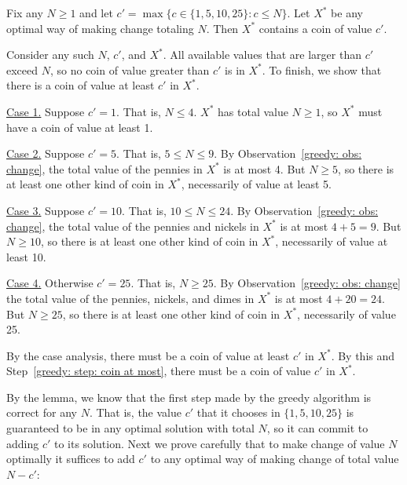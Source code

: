 \begin{lemma}\label{greedy: lemma: greedy change} 
  Fix any $N\ge 1$ and let $c' = \max\big\{c \in \{1, 5, 10, 25\} : c \le N\big\}$.
  Let $X^*$ be any optimal way of making change totaling $N$.
  Then $X^*$ contains a coin of value $c'$.
\end{lemma}
\begin{longFormProof}
  \step Consider any such $N$, $c'$, and $X^*$.
  \step\label{greedy: step: coin at most}
   All available values that are larger than $c'$ exceed $N$, so no coin of value greater than $c'$ is in $X^*$.
  \step To finish, we show that there is a coin of value at least $c'$ in $X^*$.
  \begin{block}
    \step \underline{Case 1.} Suppose $c'=1$. That is, $N\le 4$.
   \step $X^*$ has total value $N\ge 1$, so $X^*$ must have a coin of value at least 1.
  \end{block}
  \begin{block}
    \step \underline{Case 2.} Suppose $c'=5$.  That is, $5 \le N \le 9$.
   \step By Observation~\ref{greedy: obs: change},  the total value of the pennies in $X^*$ is at most 4.
    \step But $N\ge 5$, so there is at least one other kind of coin in $X^*$, necessarily of value at least 5.
  \end{block}
  \begin{block}
    \step \underline{Case 3.} Suppose $c'=10$.  That is, $10 \le N \le 24$.
    \step By Observation~\ref{greedy: obs: change}, the total value of the pennies and nickels in $X^*$ is at most $4+5=9$.
    \step But $N\ge 10$, so there is at least one other kind of coin in $X^*$, necessarily of value at least 10.
  \end{block}
  \begin{block}
    \step \underline{Case 4.} Otherwise $c'=25$.  That is, $N\ge 25$.
    \step By Observation~\ref{greedy: obs: change} the total value of the pennies, nickels, and dimes in $X^*$ is at most $4+20=24$.
    \step But $N\ge 25$, so there is at least one other kind of coin in $X^*$, necessarily of value 25.
  \end{block}
  \step By the case analysis, there must be a coin of value at least $c'$ in $X^*$.
  \step By this and Step~\ref{greedy: step: coin at most}, there must be a coin of value $c'$ in $X^*$.
\end{longFormProof}

By the lemma, we know that the first step made by the greedy algorithm is correct for any $N$.
That is, the value $c'$ that it chooses in $\{1, 5, 10, 25\}$ is guaranteed to be in any optimal solution with total $N$,
so it can commit to adding $c'$ to its solution.
Next we prove carefully that to make change of value $N$ optimally
it suffices to add $c'$ to any optimal way of making change of total value $N-c'$:

